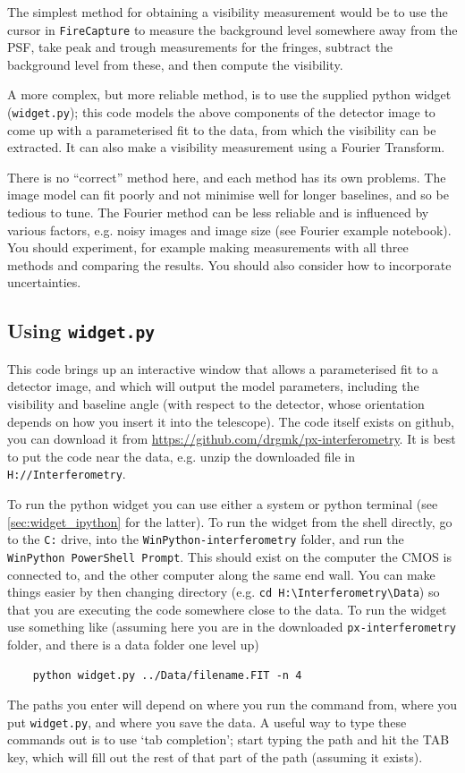 \documentclass[11pt]{article}
\begin{document}
The simplest method for obtaining a visibility measurement would be to use the cursor in \texttt{FireCapture} to measure the background level somewhere away from the PSF, take peak and trough measurements for the fringes, subtract the background level from these, and then compute the visibility.

A more complex, but more reliable method, is to use the supplied python widget (\texttt{widget.py}); this code models the above components of the detector image to come up with a parameterised fit to the data, from which the visibility can be extracted. It can also make a visibility measurement using a Fourier Transform.

There is no ``correct'' method here, and each method has its own problems. The image model can fit poorly and not minimise well for longer baselines, and so be tedious to tune. The Fourier method can be less reliable and is influenced by various factors, e.g. noisy images and image size (see Fourier example notebook). You should experiment, for example making measurements with all three methods and comparing the results. You should also consider how to incorporate uncertainties.

\subsection{Using \texttt{widget.py}}\label{sec:widget}

This code brings up an interactive window that allows a parameterised fit to a detector image, and which will output the model parameters, including the visibility and baseline angle (with respect to the detector, whose orientation depends on how you insert it into the telescope). The code itself exists on github, you can download it from
\href{https://github.com/drgmk/px-interferometry}{https://github.com/drgmk/px-interferometry}. It is best to put the code near the data, e.g. unzip the downloaded file in \texttt{H://Interferometry}.

To run the python widget you can use either a system or python terminal (see \ref{sec:widget_ipython} for the latter). To run the widget from the shell directly, go to the \texttt{C:} drive, into the \texttt{WinPython-interferometry} folder, and run the \texttt{WinPython PowerShell Prompt}. This should exist on the computer the CMOS is connected to, and the other computer along the same end wall. You can make things easier by then changing directory (e.g. \texttt{cd H:\textbackslash Interferometry\textbackslash Data}) so that you are executing the code somewhere close to the data. To run the widget use something like (assuming here you are in the downloaded \texttt{px-interferometry} folder, and there is a data folder one level up)
\begin{verbatim}
    python widget.py ../Data/filename.FIT -n 4
\end{verbatim}
The paths you enter will depend on where you run the command from, where you put \texttt{widget.py}, and where you save the data. A useful way to type these commands out is to use `tab completion'; start typing the path and hit the TAB key, which will fill out the rest of that part of the path (assuming it exists).
\end{document}
